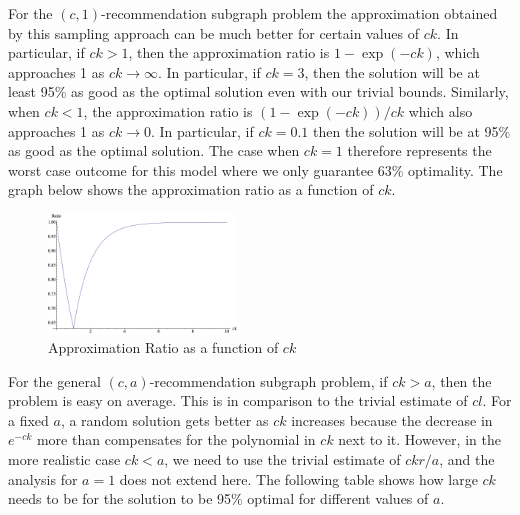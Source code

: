 For the $(c, 1)$-recommendation subgraph problem the approximation obtained by this sampling
approach can be much better for certain values of $ck$. In particular,
if $ck>1$, then the approximation ratio is $1-\exp(-ck)$, which
approaches 1 as $ck\to\infty$. In particular, if $ck=3$, then the
solution will be at least 95\% as good as the optimal solution even
with our trivial bounds. Similarly, when $ck<1$, the approximation
ratio is $(1-\exp(-ck))/ck$ which also approaches 1 as $ck\to 0$. In
particular, if $ck=0.1$ then the solution will be at 95\% as good as
the optimal solution. The case when $ck=1$ therefore represents the
worst case outcome for this model where we only guarantee 63\%
optimality. The graph below shows the approximation ratio as a
function of $ck$.\vs

\begin{figure}[h]
\centering
\includegraphics[width=5cm]{images/Sri_Original.png}
\caption{Approximation Ratio as a function of $ck$ }
\end{figure}


For the general $(c, a)$-recommendation subgraph problem, if $ck>a$, then the problem is easy on average. This
is in comparison to the trivial estimate of $cl$. For a fixed $a$, a
random solution gets better as $ck$ increases because the decrease in
$e^{-ck}$ more than compensates for the polynomial in $ck$ next to
it. However, in the more realistic case $ck<a$, we need to use the
trivial estimate of $ckr/a$, and the analysis for $a=1$ does not extend here. 
The following table shows how large 
$ck$ needs to be for the solution to be 95\% optimal for different
values of $a$.\vs


